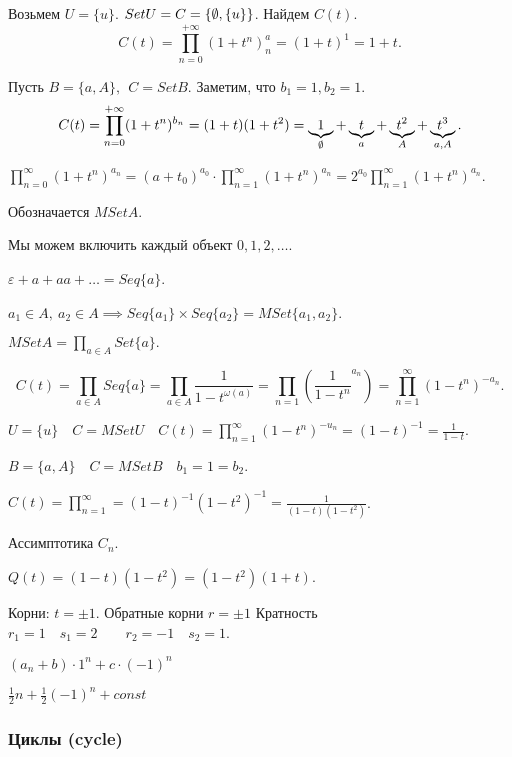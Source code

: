 \begin{example}
    Возьмем $U = \{u\}$. $Set U =C =\{\emptyset , \{u\}\}$. Найдем $C(t)$.
    \[C(t) = \prod_{n=0}^{+\infty} (1 + t^n) ^a_n = (1 + t) ^ 1 = 1+ t. \]

    Пусть $B = \{a, A \}, ~~ C = Set B$. Заметим, что $b_1 =1, b_2=1$.
    \[C(t) = \prod_{n = 0}^{+\infty} (1 + t^n)^{b_n} = (1 + t) (1  + t^2) = \underbrace{1}_{\O}  +  \underbrace{t}_{a} + \underbrace{t^2}_A + \underbrace{t^3}_{a, A}. \]

    $\prod_{n=0}^{\infty }  (1 + t^n)^{a_n} = (a + t_0)^{a_0}\cdot \prod_{n=1}^{\infty }(1 + t^n)^{a_n} = 2^{a_0}\prod_{n=1}^{\infty }(1 + t^n)^{a_n}$.
\end{example}

\begin{definition}[Мультимножество]
    Обозначается $MSet A$.

    Мы можем включить каждый объект $0, 1, 2, \ldots$.

    $\varepsilon + a + aa + \ldots = Seq \{a\}$.

    $a_1 \in A,~ a_2 \in A \implies Seq \{a_1\} \times Seq \{a_2\} = MSet \{ a_1, a_2 \}$.

    $MSet A = \prod_{a \in A} Set \{a \}.$

    \[ C(t) = \prod_{a\in A} Seq \{a\} = \prod_{a\in A} \frac{1}{1 - t^{\omega(a)}}
    = \prod_{n = 1} \left( \frac{1}{1 - t^n}^{a_n} \right)
    = \prod_{ n =1}^{\infty }(1 - t^n)^{-a_n}
    .\]
\end{definition}

\begin{example}
    $U = \{u\}\quad C = MSet U\quad C(t) = \prod_{n=1}^{\infty } (1 - t^n)^{-u_n} = (1 - t)^{-1} = \frac{1}{1 - t}$.

    $B = \{a, A\}\quad C = MSet B\quad b_1 = 1 = b_2$.

    $C(t) = \prod_{n=1}^{\infty} = (1 - t)^{-1}(1 - t^2)^{-1} = \frac{1}{(1-t)(1- t^2)}$.

    Ассимптотика $C_n$.

    $Q(t) = (1 -t)(1 - t^2) = (1 - t^2)(1+t)$.

    Корни: $t = \pm 1$. Обратные корни $r = \pm 1$ Кратность $r_1 = 1\quad s_1 = 2\qquad r_2 = -1\quad s_2 = 1$.

    $(a_n + b)\cdot 1^n + c \cdot (-1)^n $

    $\frac{1}{2}n + \frac{1}{2}(-1)^n + const$
\end{example}

\subsubsection{Циклы (cycle)}

